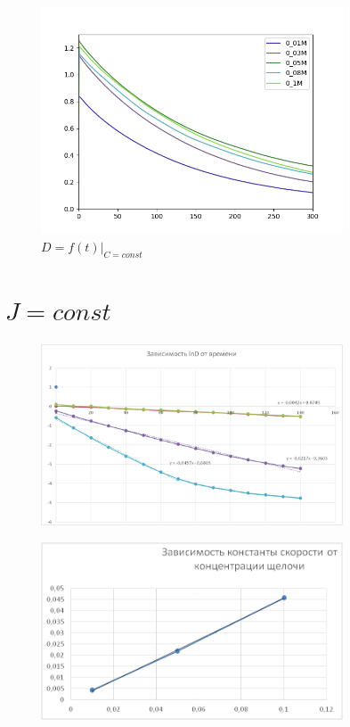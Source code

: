 \documentclass[a4paper, 12pt]{article}
\begin{document}
\begin{figure}[b!]
	\centering
	\caption{$D=f(t)|_{C=const}$}
	\includegraphics[width=0.8\textwidth]{Figure_2.png}
\end{figure}

\newpage
\section*{$J=const$}

\begin{figure}[h!]
	\centering
	\caption{}
	\includegraphics[width=0.8\textwidth]{image003.png}
\end{figure}

\begin{figure}[h!]
	\centering
	\caption{}
	\includegraphics[width=0.8\textwidth]{image005.png}
\end{figure}
\end{document}
